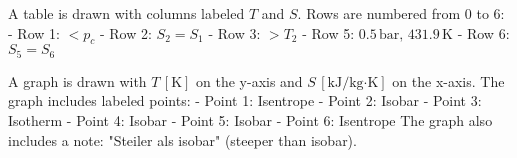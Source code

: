 A table is drawn with columns labeled \( T \) and \( S \). Rows are numbered from 0 to 6:  
- Row 1: \( < p_c \)  
- Row 2: \( S_2 = S_1 \)  
- Row 3: \( > T_2 \)  
- Row 5: \( 0.5 \, \text{bar}, \, 431.9 \, \text{K} \)  
- Row 6: \( S_5 = S_6 \)  

A graph is drawn with \( T \, [\text{K}] \) on the y-axis and \( S \, [\text{kJ/kg·K}] \) on the x-axis.  
The graph includes labeled points:  
- Point 1: Isentrope  
- Point 2: Isobar  
- Point 3: Isotherm  
- Point 4: Isobar  
- Point 5: Isobar  
- Point 6: Isentrope  
The graph also includes a note: "Steiler als isobar" (steeper than isobar).